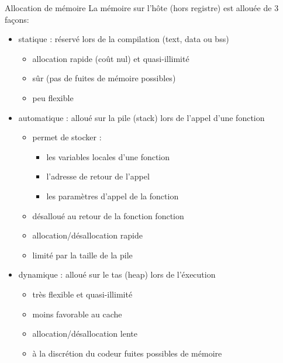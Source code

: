 \documentclass[11pt,mathserif]{beamer}
\newcommand{\scout}{\faAngellist}
\newcommand{\gezi}{\faLongArrowRight}
\newcommand{\argi}{\faLightbulbO}
\newcommand{\kontuz}{\faExclamationTriangle}
\newcommand{\pozik}{\faSmileO}
\newcommand{\triste}{\faFrownO}
\begin{document}
\begin{frame}{Allocation de mémoire}
La mémoire sur l'hôte (hors registre) est allouée de 3 façons: 
\begin{itemize}[<+->]
  \item statique : réservé lors de la compilation (text, data ou bss)
    \begin{itemize}
      \item[\pozik] allocation rapide (coût nul) et quasi-illimité
      \item[\pozik] sûr (pas de fuites de mémoire possibles)
      \item[\triste] peu flexible
    \end{itemize}
  \item automatique : alloué sur la pile (stack) lors de l'appel d'une fonction
    \begin{itemize}
      \item[\scout] permet de stocker : 
      \begin{itemize}
        \item les variables locales d'une fonction
        \item l'adresse de retour de l'appel
        \item les paramètres d'appel de la fonction
      \end{itemize}
    \item[\argi] désalloué au retour de la fonction fonction
      \item[\pozik] allocation/désallocation rapide
      \item[\kontuz] limité par la taille de la pile
    \end{itemize}
  \item dynamique : alloué sur le tas (heap) lors de l'éxecution
  \begin{itemize}
      \item[\pozik] très flexible et quasi-illimité
      \item[\triste] moins favorable au cache
      \item[\triste] allocation/désallocation lente
      \item[\kontuz] à la discrétion du codeur \gezi fuites possibles de mémoire
    \end{itemize}
\end{itemize}
\end{frame}
\end{document}
